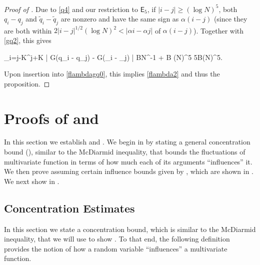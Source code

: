 \documentclass{amsart}
\numberwithin{equation}{section}
\theoremstyle{remark}
\theoremstyle{definition}
\begin{document}
\begin{proof}[Proof of ]
		\noindent Due to \eqref{q4} and our restriction to $\mathsf{E}_5$, if $|i-j| \ge (\log N)^5$, both $q_i - q_j$ and $\tilde{q}_i - \tilde{q}_j$ are nonzero and have the same sign as $\alpha (i-j)$ (since they are both within $2 |i-j|^{1/2} (\log N)^2 < |\alpha i - \alpha j|$ of $\alpha(i-j)$). Together with \eqref{gq2}, this gives 
		\begin{flalign*}
			\displaystyle\sum_{i=j-K}^{j+K} \big| G(q_i - q_j) - G(\tilde{q}_i - _j) \big| \le BN^{-1} + B (\log N)^5 \le 5B(\log N)^5.
		\end{flalign*}	
		
		\noindent Upon insertion into \eqref{flambdagq0}, this implies \eqref{flambda2} and thus the proposition.		
	\end{proof} 
	
	\section{Proofs of  and } 
	
	\label{Proof12} 
	
	In this section we establish  and . We begin in  by stating a general concentration bound (), similar to the McDiarmid inequality, that bounds the fluctuations of multivariate function in terms of how much each of its arguments ``influences'' it. We then prove  assuming certain influence bounds given by , which are shown in . We next show  in .
	
	\subsection{Concentration Estimates} 
	
	\label{EstimatesProbability}
	
	In this section we state a concentration bound, which is similar to the McDiarmid inequality, that we will use to show . To that end, the following definition provides the notion of how a random variable ``influences'' a multivariate function.
	
\end{document}
